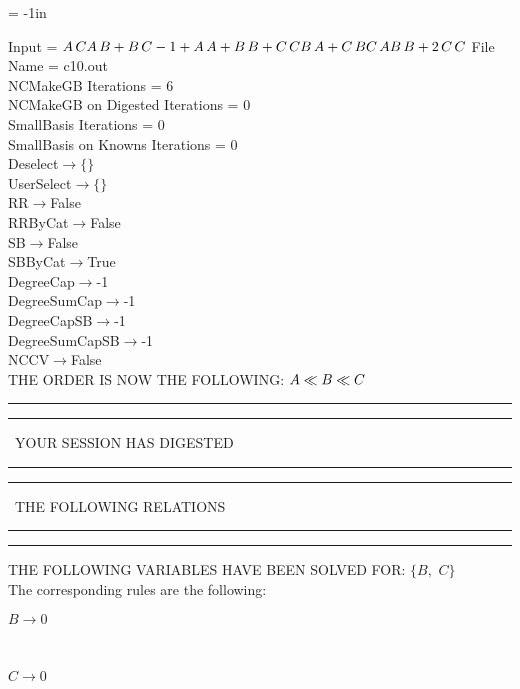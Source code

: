 \voffset = -1in
\evensidemargin 0.1in
\oddsidemargin 0.1in
\textheight 9in
\textwidth 6in

\normalsize
\baselineskip=12pt
\noindent
Input = 
$
\\A\,
 C\\
A\,
 B + B\,
 C\\
-1 + A\,
 A + B\,
 B + C\,
 C\\
B\,
 A + C\,
 B\\
C\,
 A\\
B\,
 B + 2\,
 C\,
 C\\
$
File Name = c10.out\\
NCMakeGB Iterations = 6\\
NCMakeGB on Digested Iterations = 0\\
SmallBasis Iterations = 0\\
SmallBasis on Knowns Iterations = 0\\
Deselect$\rightarrow \{\}$\\
UserSelect$\rightarrow \{\}$\\
RR$\rightarrow $False\\
RRByCat$\rightarrow $False\\
SB$\rightarrow $False\\
SBByCat$\rightarrow $True\\
DegreeCap$\rightarrow $-1\\
DegreeSumCap$\rightarrow $-1\\
DegreeCapSB$\rightarrow $-1\\
DegreeSumCapSB$\rightarrow $-1\\
NCCV$\rightarrow $False\\
THE ORDER IS NOW THE FOLLOWING:\hfil\break
$
A\ll
B\ll
C\\
$
\rule[2pt]{6in}{4pt}\hfil\break
\rule[2pt]{1.879in}{4pt}
\ YOUR SESSION HAS DIGESTED\ 
\rule[2pt]{1.879in}{4pt}\hfil\break
\rule[2pt]{1.923in}{4pt}
\ THE FOLLOWING RELATIONS\ 
\rule[2pt]{1.923in}{4pt}\hfil\break
\rule[2pt]{6in}{4pt}\hfil\break
THE FOLLOWING VARIABLES HAVE BEEN SOLVED FOR:\hfil\break
$\{B,
$ $
C\}$
\smallskip\\
The corresponding rules are the following:\smallskip\\
\begin{minipage}{6in}
$
B\rightarrow 0
$
\end{minipage}\medskip\\
\begin{minipage}{6in}
$
C\rightarrow 0
$
\end{minipage}\medskip\\
